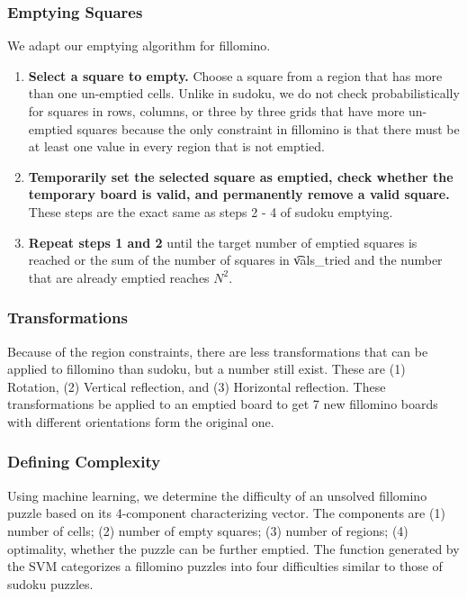 \subsubsection{Emptying Squares}

We adapt our emptying algorithm for fillomino.

\begin{enumerate}
\item {\bf Select a square to empty.} Choose a square from a region that has more than one un-emptied cells. Unlike in sudoku, we do not check probabilistically for squares in rows, columns, or three by three grids that have more un-emptied squares because the only constraint in fillomino is that there must be at least one value in every region that is not emptied.
\item {\bf Temporarily set the selected square as emptied, check whether the temporary board is valid, and permanently remove a valid square.} These steps are the exact same as steps 2 - 4 of sudoku emptying.
\item{\bf Repeat steps 1 and 2} until the target number of emptied squares is reached or the sum of the number of squares in \t{vals\_tried} and the number that are already emptied reaches $N^2$. 
\end{enumerate}

\subsubsection{Transformations}
Because of the region constraints, there are less
transformations that can be applied to fillomino than sudoku, but a
number still exist. These are (1) Rotation, (2) Vertical reflection, and (3) Horizontal reflection. These transformations be applied to an emptied board to get 7 new fillomino boards with different orientations form the original one.

\subsubsection{Defining Complexity}
Using machine learning, we determine the difficulty of an unsolved
fillomino puzzle based on its 4-component characterizing vector. The components are (1) number of cells; (2) number of empty squares; (3) number of regions; (4) optimality, whether the puzzle can be further emptied. The function generated by the SVM categorizes a fillomino puzzles into four difficulties similar to those of sudoku puzzles.

